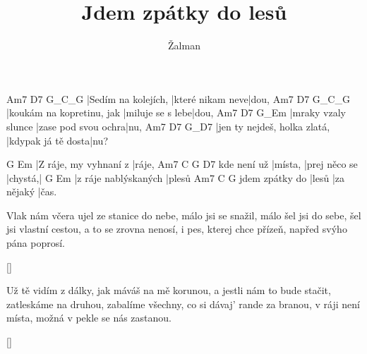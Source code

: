 \documentclass{song}
\title{Jdem zpátky do lesů}
\author{Žalman}
\begin{document}
\strophe
Am7                 D7               G_C_G
|Sedím na kolejích, |které nikam neve|dou,
Am7                       D7               G_C_G
|koukám na kopretinu, jak |miluje se s lebe|dou,
Am7                 D7                  G_Em
|mraky vzaly slunce |zase pod svou ochra|nu,
Am7                          D7                 G_D7
|jen ty nejdeš, holka zlatá, |kdypak já tě dosta|nu?
\endstrophe

G                     Em
|Z ráje, my vyhnaní z |ráje,
            Am7     C             G       D7
kde není už |místa, |prej něco se |chystá,|
G                    Em
|z ráje nablýskaných |plesů
               Am7   C          G
jdem zpátky do |lesů |za nějaký |čas.
\endstrophe

\strophe*
Vlak nám včera ujel ze stanice do nebe,
málo jsi se snažil, málo šel jsi do sebe,
šel jsi vlastní cestou, a to se zrovna nenosí,
i pes, kterej chce přízeň, napřed svýho pána poprosí.
\endstrophe

\ref{}

\strophe*
Už tě vidím z dálky, jak máváš na mě korunou,
a jestli nám to bude stačit, zatleskáme na druhou,
zabalíme všechny, co si dávaj' rande za branou,
v ráji není místa, možná v pekle se nás zastanou.
\endstrophe

\ref{}
\end{document}
